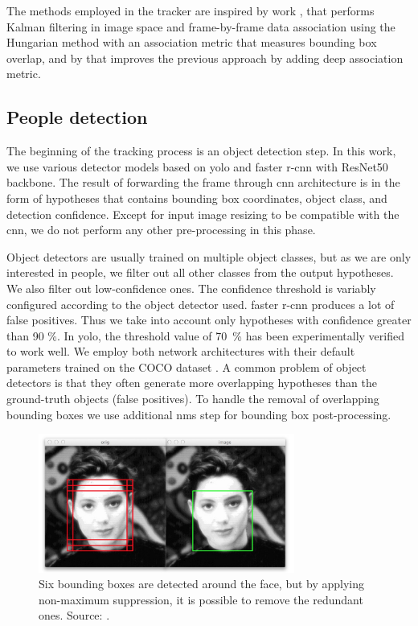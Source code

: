     The methods employed in the tracker are inspired by work \cite{2016arXiv160502688short}, that performs Kalman filtering \cite{kalman1960new} in image space and frame-by-frame data association using the Hungarian method \cite{jonker1987shortest} with an association metric that measures bounding box overlap, and by \cite{wojke2017simple} that improves the previous approach by adding deep association metric.

    \subsection{People detection}
        The beginning of the tracking process is an object detection step. In this work, we use various detector models based on \gls{yolo} and \gls{faster r-cnn} with ResNet50 backbone. The result of forwarding the frame through \gls{cnn} architecture is in the form of hypotheses that contains bounding box coordinates, object class, and detection confidence. Except for input image resizing to be compatible with the \gls{cnn}, we do not perform any other pre-processing in this phase.
        
        Object detectors are usually trained on multiple object classes, but as we are only interested in people, we filter out all other classes from the output hypotheses. We also filter out low-confidence ones. The confidence threshold is variably configured according to the object detector used. \Gls{faster r-cnn} produces a lot of false positives. Thus we take into account only hypotheses with confidence greater than 90 \%. In \gls{yolo}, the threshold value of 70~\% has been experimentally verified to work well. We employ both network architectures with their default parameters trained on the COCO dataset \cite{lin2014microsoft}. 
        A common problem of object detectors is that they often generate more overlapping hypotheses than the ground-truth objects (false positives). To handle the removal of overlapping bounding boxes we use additional \gls{nms} step \cite{rosebrocknms} for bounding box post-processing.
        
        \begin{figure}[ht]
            \centering
            \includegraphics[width=0.75\textwidth]{resources/non_maximum_surpression.png}
            \caption{Six bounding boxes are detected around the face, but by applying non-maximum suppression, it is possible to remove the redundant ones. Source: \cite{rosebrocknms}.}
            \label{fig:non_maximum_surpression}
        \end{figure}
        
